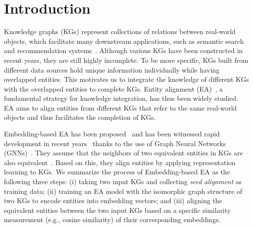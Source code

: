 \section{Introduction}
\label{sec:intro}
Knowledge graphs (KGs) represent collections of relations between real-world objects, which facilitate many downstream applications, such as semantic search~\cite{XiongPC17} and recommendation systems~\cite{ZhangYLXM2016}.
Although various KGs have been constructed in recent years, they are still highly incomplete. To be more specific, KGs built from different data sources hold unique information individually while having overlapped entities. This motivates us to integrate the knowledge of different KGs with the overlapped entities to complete KGs. 
Entity alignment (EA)~\cite{MTransE17}, a fundamental strategy for knowledge integration, has thus been widely studied. EA aims to align entities from different KGs that refer to the same real-world objects and thus facilitates the completion of KGs. 

Embedding-based EA has been proposed~\cite{MTransE17} and has been witnessed rapid development in recent years~\cite{KECG19, RREA20, AliNet20, HyperKA20, DualAMN21} thanks to the use of Graph Neural Networks (GNNs)~\cite{GCN17, GAT18, GraphSAGE17}.
They assume that the neighbors of two equivalent entities in KGs are also equivalent~\cite{AttrGNN20}. Based on this, they align entities by applying representation learning to KGs. We summarize the process of  Embedding-based EA as the following three steps: (i) taking two input KGs and collecting \emph{seed alignment} as training data; (ii) training an EA model with the isomorphic graph structure of two KGs to encode entities into embedding vectors; and (iii) aligning the equivalent entities between the two input KGs based on a specific similarity measurement (e.g., cosine similarity) of their corresponding embeddings.


